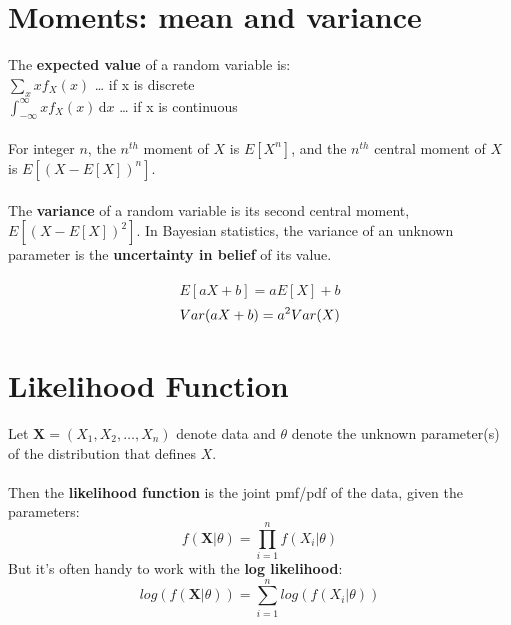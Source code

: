 \documentclass[12pt]{book}
\begin{document}
\section{Moments: mean and variance}
The \textbf{expected value} of a random variable is:\\
$ \sum_{x} xf_X(x)$ \hspace{10 mm}   \dots \hspace{10 mm}   if x is discrete \\
$ \int_{-\infty}^{\infty} xf_X(x)\, \mathrm{d}x $
  \hspace{4 mm}   \dots \hspace{10 mm}  if x is continuous
  \\\\
For integer $n$, the $n^{th}$ moment of $X$ is $E[X^n]$, and the $n^{th}$ central moment of $X$ is $E[(X-E[X])^n]$. 
\\\\
The \textbf{variance} of a random variable is its second central moment,
$E[(X-E[X])^2]$. In Bayesian statistics, the variance of an unknown parameter is the \textbf{uncertainty in belief} of its value.
\\\\
\begin{equation}
E[aX + b] = aE[X] + b 
\end{equation}
\begin{equation}
Var(aX + b) = a^2Var(X) \\
\end{equation}






\section{Likelihood Function}
Let $\textbf{X} = (X_1, X_2, \dots, X_n)$ denote data and $\theta$ denote the unknown parameter(s) of the distribution that defines $X$.
\\\\
Then the \textbf{likelihood function} is the joint pmf/pdf of the data, given the parameters:
\begin{equation}
f(\textbf{X}|\theta) = \prod_{i=1}^n{f(X_i |\theta)}
\end{equation}
But it's often handy to work with the \textbf{log likelihood}:
\begin{equation}
log(f(\textbf{X}|\theta)) = \sum_{i=1}^n log(f(X_i |\theta))
\end{equation}
\end{document}
